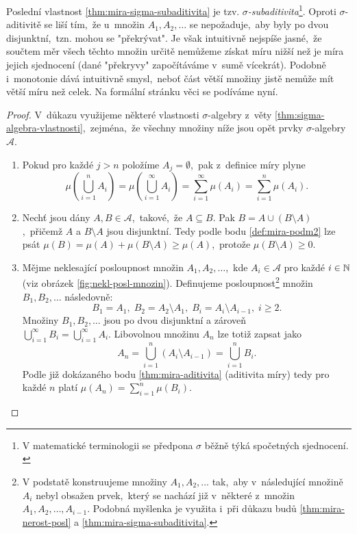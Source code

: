 Poslední vlastnost \ref{thm:mira-sigma-subaditivita} je tzv. \emph{$\sigma$-subaditivita}\footnote{V matematické terminologii se předpona $\sigma$ běžně týká spočetných sjednocení. \citep[str. 2]{Lukes2013}}. Oproti $\sigma$-aditivitě se liší tím,~že u~množin $A_1,A_2,\dots$ se nepožaduje,~aby byly po dvou disjunktní,~tzn. mohou se "překrývat". Je však intuitivně nejspíše jasné,~že součtem měr všech těchto množin určitě nemůžeme získat míru nižší než je míra jejich sjednocení (dané "překryvy" započítáváme v~sumě vícekrát). Podobně i~monotonie dává intuitivně smysl,~neboť část větší množiny jistě nemůže mít větší míru než celek. Na formální stránku věci se podíváme nyní.
\begin{proof}
    V~důkazu využijeme některé vlastnosti $\sigma$-algebry z~věty \ref{thm:sigma-algebra-vlastnosti},~zejména,~že všechny množiny níže jsou opět prvky $\sigma$-algebry~$\mathcal{A}$.
    \begin{enumerate}[label=\textit{(\roman*)}]
        \item Pokud pro každé $j>n$ položíme $A_j=\emptyset$,~pak z~definice míry plyne
        \[\mu\left(\bigcup_{i=1}^n A_i\right)=\mu\left(\bigcup_{i=1}^\infty A_i\right)=\sum_{i=1}^{\infty}\mu(A_i)=\sum_{i=1}^{n}\mu(A_i).\]
        \item Nechť jsou dány $A,B\in\mathcal{A}$,~takové,~že $A\subseteq B$. Pak $B=A\cup(B\setminus A)$,~přičemž $A$ a $B\setminus A$ jsou disjunktní. Tedy podle bodu \ref{def:mira-podm2} lze psát $\mu(B)=\mu(A)+\mu(B\setminus A)\geqslant\mu(A)$,~protože $\mu(B\setminus A)\geqslant 0$.
        \item Mějme neklesající posloupnost množin $A_1,A_2,\ldots$,~kde $A_i\in\mathcal{A}$ pro každé $i\in\mathbb{N}$ (viz obrázek \ref{fig:nekl-posl-mnozin}).
        Definujeme posloupnost\footnote{V podstatě konstruujeme množiny $A_1,A_2,\ldots$ tak,~aby v~následující množině $A_i$ nebyl obsažen prvek,~který se nachází již v~některé z~množin $A_1,A_2,\ldots,A_{i-1}$. Podobná myšlenka je využita i~při důkazu budů \ref{thm:mira-nerost-posl} a \ref{thm:mira-sigma-subaditivita}.} množin $B_1,B_2,\ldots$ následovně:
        \[B_1=A_1,\;B_2=A_2\setminus A_1,\;B_i=A_i\setminus A_{i-1},\;i\geqslant 2.\]
        Množiny $B_1,B_2,\dots$ jsou po dvou disjunktní a zároveň\\$\bigcup_{i=1}^\infty B_i=\bigcup_{i=1}^\infty A_i$. Libovolnou množinu $A_n$ lze totiž zapsat jako
        \[A_n=\bigcup_{i=1}^n (A_i\setminus A_{i-1})=\bigcup_{i=1}^n B_i.\] 
        Podle již dokázaného bodu \ref{thm:mira-aditivita} (aditivita míry) tedy pro každé $n$ platí $\mu(A_n)=\sum_{i=1}^{n}\mu(B_i)$.

\end{enumerate}
\end{proof}
